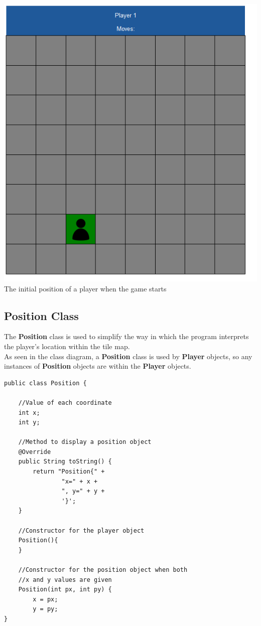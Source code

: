 \documentclass[a4paper,12pt]{extarticle}
\begin{document}
\begin{center}
\includegraphics[width=\textwidth]{BasicMap1.png}\\
The initial position of a player when the game starts
\end{center}

\newpage
\subsection{Position Class}

The \textbf{Position} class is used to simplify the way in which the program interprets the player's location within the tile map.\\

\noindent As seen in the class diagram, a \textbf{Position} class is used by \textbf{Player} objects, so any instances of \textbf{Position} objects are within the \textbf{Player} objects.

\begin{lstlisting}
public class Position {

    //Value of each coordinate
    int x;
    int y;

    //Method to display a position object
    @Override
    public String toString() {
        return "Position{" +
                "x=" + x +
                ", y=" + y +
                '}';
    }

    //Constructor for the player object
    Position(){
    }

    //Constructor for the position object when both 
    //x and y values are given
    Position(int px, int py) {
        x = px;
        y = py;
}
\end{lstlisting}
\vspace{4mm}
\end{document}
